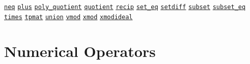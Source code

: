 \begin{list}{}
\hyperlink{operator:NEQ}{\texttt{neq}}
\hyperlink{operator:PLUS}{\texttt{plus}}
\hyperlink{operator:POLY_QUOTIENT}{\texttt{poly\_quotient}}
\hyperlink{operator:QUOTIENT}{\texttt{quotient}}
\hyperlink{operator:RECIP}{\texttt{recip}}
\hyperlink{operator:SET_EQ}{\texttt{set\_eq}}
\hyperlink{operator:SETDIFF}{\texttt{setdiff}}
\hyperlink{operator:SUBSET}{\texttt{subset}}
\hyperlink{operator:SUBSET_EQ}{\texttt{subset\_eq}}
\hyperlink{operator:TIMES}{\texttt{times}}
\hyperlink{operator:TPMAT}{\texttt{tpmat}}
\hyperlink{operator:SETS_UNION}{\texttt{union}}
\hyperlink{operator:VMOD}{\texttt{vmod}}
\hyperlink{operator:XMOD}{\texttt{xmod}}
\hyperlink{operator:XMODIDEAL}{\texttt{xmodideal}}
\halfinterwordspace

\section{Numerical Operators}


\end{list}
